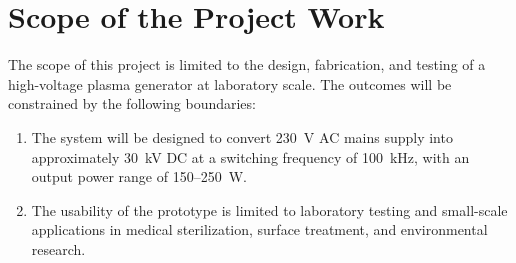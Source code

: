 \section{Scope of the Project Work}
The scope of this project is limited to the design, fabrication, and testing of a high-voltage plasma generator at laboratory scale. The outcomes will be constrained by the following boundaries:
\begin{enumerate}
    \item The system will be designed to convert 230~V AC mains supply into approximately 30~kV DC at a switching frequency of 100~kHz, with an output power range of 150--250~W.

    \item The usability of the prototype is limited to laboratory testing and small-scale applications in medical sterilization, surface treatment, and environmental research.
\end{enumerate}
